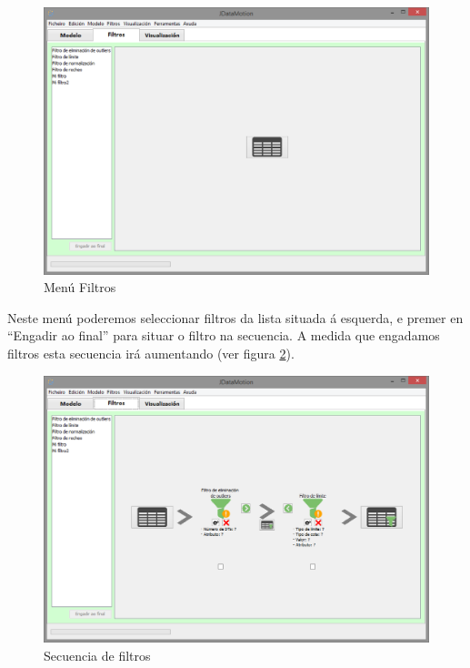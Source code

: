 \begin{figure}
\centering
\includegraphics[width=\textwidth,height=\textheight,keepaspectratio]{figuras/manualFiltros}
\caption{Menú Filtros}
\label{manualFiltros}
\end{figure}

Neste menú poderemos seleccionar filtros da lista situada á esquerda, e premer en ``Engadir ao final'' para situar o filtro na secuencia. A medida que engadamos filtros esta secuencia irá aumentando (ver figura \ref{secuenciaFiltros}).

\begin{figure}
\centering
\includegraphics[width=\textwidth,height=\textheight,keepaspectratio]{figuras/secuenciaFiltros}
\caption{Secuencia de filtros}
\label{secuenciaFiltros}
\end{figure}

